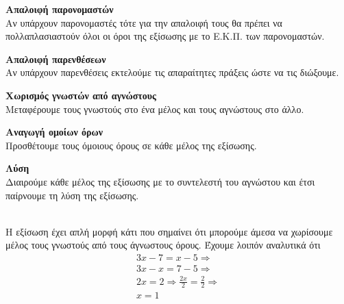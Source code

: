 \begin{Methodos}{9cm}
\begin{bhma}
\item\textbf{Απαλοιφή παρονομαστών}\\
Αν υπάρχουν παρονομαστές τότε για την απαλοιφή τους θα πρέπει να πολλαπλασιαστούν όλοι οι όροι της εξίσωσης με το Ε.Κ.Π. των παρονομαστών.	
\item \textbf{Απαλοιφή παρενθέσεων}\\
Aν υπάρχουν παρενθέσεις εκτελούμε τις απαραίτητες πράξεις ώστε να τις διώξουμε.
\item \textbf{Χωρισμός γνωστών από αγνώστους}\\
Μεταφέρουμε τους γνωστούς στο ένα μέλος και τους αγνώστους στο άλλο.
\item \textbf{Αναγωγή ομοίων όρων}\\
Προσθέτουμε τους όμοιους όρους σε κάθε μέλος της εξίσωσης.
\item \textbf{Λύση}\\
Διαιρούμε κάθε μέλος της εξίσωσης με το συντελεστή του αγνώστου και έτσι παίρνουμε τη λύση της εξίσωσης.
\end{bhma}
\end{Methodos}
\lysh\\
Η εξίσωση έχει απλή μορφή κάτι που σημαίνει ότι μπορούμε άμεσα να χωρίσουμε μέλος τους γνωστούς από τους άγνωστους όρους. Έχουμε λοιπόν αναλυτικά ότι 
\begin{gather*}
3x-7=x-5\Rightarrow\\
3x-x=7-5\Rightarrow\\
2x=2\Rightarrow \frac{2x}{2}=\frac{2}{2}\Rightarrow\\
x=1
\end{gather*}
\lysh
